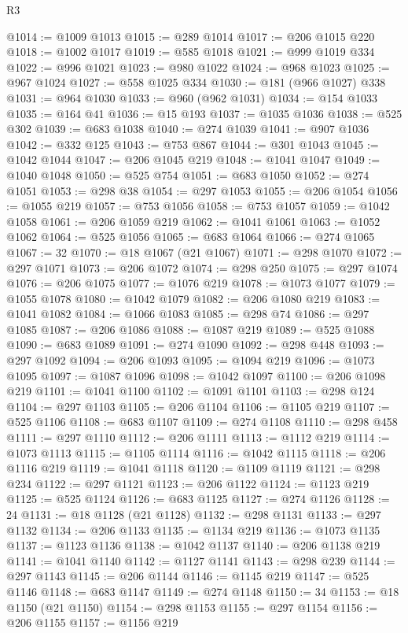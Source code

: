 \begin{lexlean}{R3}
\begin{coremodule}
@1014 := @1009 @1013
@1015 := @289 @1014
@1017 := @206 @1015 @220
@1018 := @1002 @1017
@1019 := @585 @1018
@1021 := @999 @1019 @334
@1022 := @996 @1021
@1023 := @980 @1022
@1024 := @968 @1023
@1025 := @967 @1024
@1027 := @558 @1025 @334
@1030 := @181 (@966 @1027) @338
@1031 := @964 @1030
@1033 := @960 (@962 @1031)
@1034 := @154 @1033
@1035 := @164 @41
@1036 := @15 @193
@1037 := @1035 @1036
@1038 := @525 @302
@1039 := @683 @1038
@1040 := @274 @1039
@1041 := @907 @1036
@1042 := @332 @125
@1043 := @753 @867
@1044 := @301 @1043
@1045 := @1042 @1044
@1047 := @206 @1045 @219
@1048 := @1041 @1047
@1049 := @1040 @1048
@1050 := @525 @754
@1051 := @683 @1050
@1052 := @274 @1051
@1053 := @298 @38
@1054 := @297 @1053
@1055 := @206 @1054
@1056 := @1055 @219
@1057 := @753 @1056
@1058 := @753 @1057
@1059 := @1042 @1058
@1061 := @206 @1059 @219
@1062 := @1041 @1061
@1063 := @1052 @1062
@1064 := @525 @1056
@1065 := @683 @1064
@1066 := @274 @1065
@1067 := 32
@1070 := @18 @1067 (@21 @1067)
@1071 := @298 @1070
@1072 := @297 @1071
@1073 := @206 @1072
@1074 := @298 @250
@1075 := @297 @1074
@1076 := @206 @1075
@1077 := @1076 @219
@1078 := @1073 @1077
@1079 := @1055 @1078
@1080 := @1042 @1079
@1082 := @206 @1080 @219
@1083 := @1041 @1082
@1084 := @1066 @1083
@1085 := @298 @74
@1086 := @297 @1085
@1087 := @206 @1086
@1088 := @1087 @219
@1089 := @525 @1088
@1090 := @683 @1089
@1091 := @274 @1090
@1092 := @298 @448
@1093 := @297 @1092
@1094 := @206 @1093
@1095 := @1094 @219
@1096 := @1073 @1095
@1097 := @1087 @1096
@1098 := @1042 @1097
@1100 := @206 @1098 @219
@1101 := @1041 @1100
@1102 := @1091 @1101
@1103 := @298 @124
@1104 := @297 @1103
@1105 := @206 @1104
@1106 := @1105 @219
@1107 := @525 @1106
@1108 := @683 @1107
@1109 := @274 @1108
@1110 := @298 @458
@1111 := @297 @1110
@1112 := @206 @1111
@1113 := @1112 @219
@1114 := @1073 @1113
@1115 := @1105 @1114
@1116 := @1042 @1115
@1118 := @206 @1116 @219
@1119 := @1041 @1118
@1120 := @1109 @1119
@1121 := @298 @234
@1122 := @297 @1121
@1123 := @206 @1122
@1124 := @1123 @219
@1125 := @525 @1124
@1126 := @683 @1125
@1127 := @274 @1126
@1128 := 24
@1131 := @18 @1128 (@21 @1128)
@1132 := @298 @1131
@1133 := @297 @1132
@1134 := @206 @1133
@1135 := @1134 @219
@1136 := @1073 @1135
@1137 := @1123 @1136
@1138 := @1042 @1137
@1140 := @206 @1138 @219
@1141 := @1041 @1140
@1142 := @1127 @1141
@1143 := @298 @239
@1144 := @297 @1143
@1145 := @206 @1144
@1146 := @1145 @219
@1147 := @525 @1146
@1148 := @683 @1147
@1149 := @274 @1148
@1150 := 34
@1153 := @18 @1150 (@21 @1150)
@1154 := @298 @1153
@1155 := @297 @1154
@1156 := @206 @1155
@1157 := @1156 @219

\end{coremodule}
\end{lexlean}
